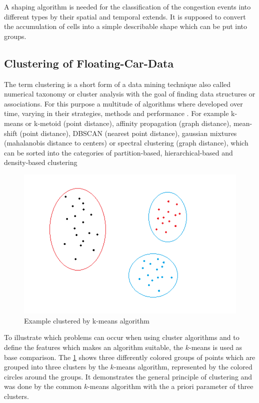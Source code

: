 A shaping algorithm is needed for the classification of the congestion events into different types by their spatial and temporal extends. It is supposed to convert the accumulation of cells into a simple describable shape which can be put into groups.

\subsection{Clustering of Floating-Car-Data}
\label{methodology_detection_clustering}
The term clustering is a short form of a data mining technique also called numerical taxonomy or cluster analysis with the goal of finding data structures or associations. For this purpose a multitude of algorithms where developed over time, varying in their strategies, methods and performance \parencite{Busch2004}. For example k-means or k-metoid (point distance), affinity propagation (graph distance), mean-shift (point distance), DBSCAN (nearest point distance), gaussian mixtures (mahalanobis distance to centers) or spectral clustering (graph distance), which can be sorted into the categories of partition-based, hierarchical-based and density-based clustering \parencite{Chauhan2020,Yildirim2020}

\bigskip

\begin{figure}[ht!]
	\centering
	\includegraphics[scale=0.5]{images/cluster_0.png}
	\caption{Example clustered by k-means algorithm \parencite{Yildirim2020}}
	\label{cluster_kmeans}
\end{figure}

To illustrate which problems can occur when using cluster algorithms and to define the features which makes an algorithm suitable, the $k$-means is used as base comparison. The \cref{cluster_kmeans} shows three differently colored groups of points which are grouped into three clusters by the $k$-means algorithm, represented by the colored circles around the groups. It demonstrates the general principle of clustering and was done by the common $k$-means algorithm with the a priori parameter of three clusters. 

